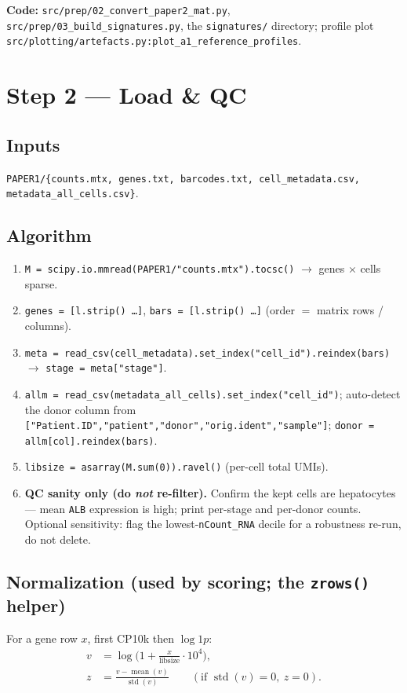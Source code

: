 \documentclass[11pt]{article}
\newcommand{\code}[1]{\texttt{\small #1}}
\begin{document}
\medskip
\noindent\textbf{Code:} \code{src/prep/02\_convert\_paper2\_mat.py},
\code{src/prep/03\_build\_signatures.py}, the \code{signatures/} directory;
profile plot \code{src/plotting/artefacts.py:plot\_a1\_reference\_profiles}.

\section{Step 2 --- Load \& QC}

\subsection{Inputs}
\code{PAPER1/\{counts.mtx, genes.txt, barcodes.txt, cell\_metadata.csv, metadata\_all\_cells.csv\}}.

\subsection{Algorithm}
\begin{enumerate}[leftmargin=1.6em]
  \item \code{M = scipy.io.mmread(PAPER1/"counts.mtx").tocsc()} $\rightarrow$ genes $\times$ cells
        sparse.
  \item \code{genes = [l.strip() \ldots]}, \code{bars = [l.strip() \ldots]} (order $=$ matrix
        rows / columns).
  \item \code{meta = read\_csv(cell\_metadata).set\_index("cell\_id").reindex(bars)} $\rightarrow$
        \code{stage = meta["stage"]}.
  \item \code{allm = read\_csv(metadata\_all\_cells).set\_index("cell\_id")}; auto-detect the donor
        column from \code{["Patient.ID","patient","donor","orig.ident","sample"]};
        \code{donor = allm[col].reindex(bars)}.
  \item \code{libsize = asarray(M.sum(0)).ravel()} (per-cell total UMIs).
  \item \textbf{QC sanity only (do \emph{not} re-filter).} Confirm the kept cells are
        hepatocytes --- mean \code{ALB} expression is high; print per-stage and per-donor counts.
        Optional sensitivity: flag the lowest-\code{nCount\_RNA} decile for a robustness re-run,
        do not delete.
\end{enumerate}

\subsection{Normalization (used by scoring; the \code{zrows()} helper)}
For a gene row $x$, first CP10k then $\log 1p$:
\begin{align}
  v   &= \log\!\Big(1 + \frac{x}{\text{libsize}} \cdot 10^4\Big), \\
  z   &= \frac{v - \operatorname{mean}(v)}{\operatorname{std}(v)}
         \qquad (\text{if } \operatorname{std}(v)=0,\ z=0).
\end{align}
\end{document}
